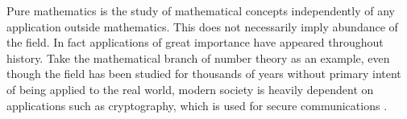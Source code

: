 \noindent
Pure mathematics is the study of mathematical concepts 
independently of any application outside mathematics. This does not necessarily imply abundance of the field. In fact applications of great importance have appeared throughout history. Take the mathematical branch of number theory as an example, even though the field has been studied for thousands of years without primary intent of being applied to the real world, modern society is heavily dependent on applications such as cryptography, which is used for secure communications \cite{crypto}.\\\\